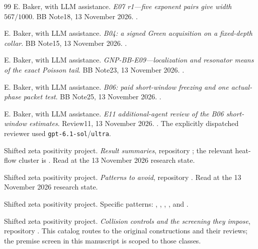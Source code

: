 \begin{thebibliography}{99}
 E. Baker, with LLM assistance.
\emph{E07 r1---five exponent pairs give width $567/1000$}.
BB Note18, 13 November 2026.
.

 E. Baker, with LLM assistance.
\emph{B04: a signed Green acquisition on a fixed-depth collar}.
BB Note15, 13 November 2026.
.

 E. Baker, with LLM assistance.
\emph{GNP-BB-E09---localization and resonator means of the exact Poisson tail}.
BB Note23, 13 November 2026.
.

 E. Baker, with LLM assistance.
\emph{B06: paid short-window freezing and one actual-phase packet test}.
BB Note25, 13 November 2026.
.

 E. Baker, with LLM assistance.
\emph{E11 additional-agent review of the B06 short-window estimates}.
Review11, 13 November 2026.
.
The explicitly dispatched reviewer used \texttt{gpt-6.1-sol}/\texttt{ultra}.

 Shifted zeta positivity project.
\emph{Result summaries}, repository ;
the relevant heat-flow cluster is
.
Read at the 13 November 2026 research state.

 Shifted zeta positivity project.
\emph{Patterns to avoid}, repository .
Read at the 13 November 2026 research state.

 Shifted zeta positivity project.
Specific patterns: ,
,
,
, and
.

 Shifted zeta positivity project.
\emph{Collision controls and the screening they impose}, repository
.
This catalog routes to the original constructions and their reviews;
the premise screen in this manuscript is scoped to those classes.
\end{thebibliography}

